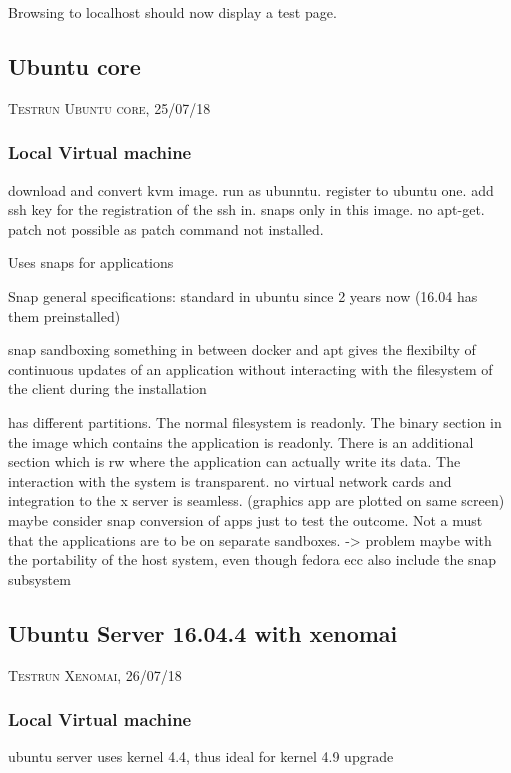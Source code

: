 \documentclass[]{scrartcl}
\begin{document}
Browsing to localhost should now display a test page.

\subsection{Ubuntu core}
{\small\textsc{Testrun Ubuntu core, 25/07/18} \bigskip}

\subsubsection{Local Virtual machine}
download and convert kvm image. run as ubunntu. register to ubuntu one. add ssh key for the registration of the ssh in. snaps only in this image. no apt-get. patch not possible as patch command not installed.

Uses snaps for applications

Snap general specifications:
standard in ubuntu since 2 years now (16.04 has them preinstalled)

snap sandboxing
something in between docker and apt
gives the flexibilty of continuous updates of an application without interacting with the filesystem of the client during the installation

has different partitions. The normal filesystem is readonly. The binary section in the image which contains the application is readonly. There is an additional section which is rw where the application can actually write its data. 
The interaction with the system is transparent. no virtual network cards and integration to the x server is seamless. (graphics app are plotted on same screen)
maybe consider snap conversion of apps just to test the outcome. Not a must that the applications are to be on separate sandboxes. -> problem maybe with the portability of the host system, even though fedora ecc also include the snap subsystem

\subsection{Ubuntu Server 16.04.4 with xenomai}

{\small\textsc{Testrun Xenomai, 26/07/18} \bigskip}

\subsubsection{Local Virtual machine}

ubuntu server uses kernel 4.4, thus ideal for kernel 4.9 upgrade
\end{document}
